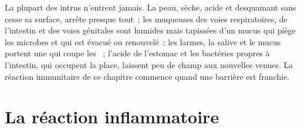 \begin{proposition}\label{prop:g12:innate-immunity:barriers}
La plupart des intrus n'entrent jamais. La peau, sèche, acide et
desquamant sans cesse sa surface, arrête presque tout~; les muqueuses
des voies respiratoires, de l'intestin et des voies génitales sont
humides mais tapissées d'un mucus qui piège les microbes et qui est
évacué ou renouvelé~; les larmes, la salive et le mucus portent une
 qui coupe les ~; l'acide de l'estomac et les
bactéries propres à l'intestin, qui occupent la place, laissent peu de
champ aux nouvelles venues. La réaction immunitaire de ce chapitre
commence quand une barrière est franchie.
\end{proposition}
\admitted

\section{La réaction inflammatoire}

